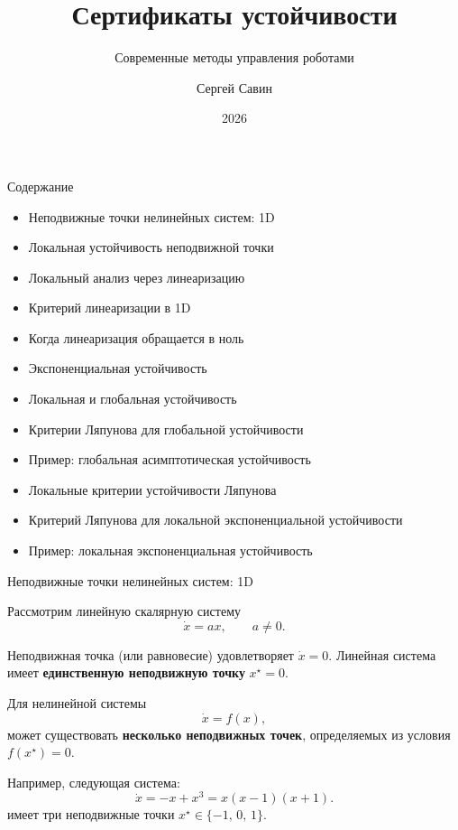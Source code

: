 \documentclass{beamer}
\subtitle{Современные методы управления роботами}
\author{Сергей Савин}
\date{2026}
\title{Сертификаты устойчивости}
\begin{document}
	\maketitle
	
	
	\begin{frame}{Содержание}
		\begin{itemize}
			\item Неподвижные точки нелинейных систем: 1D
			\item Локальная устойчивость неподвижной точки
			\item Локальный анализ через линеаризацию
			\item Критерий линеаризации в 1D
			\item Когда линеаризация обращается в ноль
			\item Экспоненциальная устойчивость
			\item Локальная и глобальная устойчивость
			\item Критерии Ляпунова для глобальной устойчивости
			\item Пример: глобальная асимптотическая устойчивость
			\item Локальные критерии устойчивости Ляпунова
			\item Критерий Ляпунова для локальной экспоненциальной устойчивости
			\item Пример: локальная экспоненциальная устойчивость
		\end{itemize}
		
	\end{frame}
	
	
	
	
	\begin{frame}{Неподвижные точки нелинейных систем: 1D}
		\begin{flushleft}
			Рассмотрим линейную скалярную систему
			\[
			\dot{x} = ax, \qquad a \neq 0.
			\]
			
			Неподвижная точка (или равновесие) удовлетворяет \(	\dot{x} = 0\). Линейная система имеет \textbf{единственную неподвижную точку} \(x^\star = 0\).
			
			\bigskip
			
			Для нелинейной системы
			\[
			\dot{x} = f(x),
			\]
			может существовать \textbf{несколько неподвижных точек}, определяемых из условия \(f(x^\star)=0\). 
			
			
			\bigskip
			
			
			Например, следующая система:
			\[
			\dot{x} = -x+x^3 = x(x-1)(x+1).
			\]
			имеет три неподвижные точки \(x^\star \in \{-1,\,0,\,1\}\).
			
			
		\end{flushleft}
	\end{frame}
	
\end{document}
